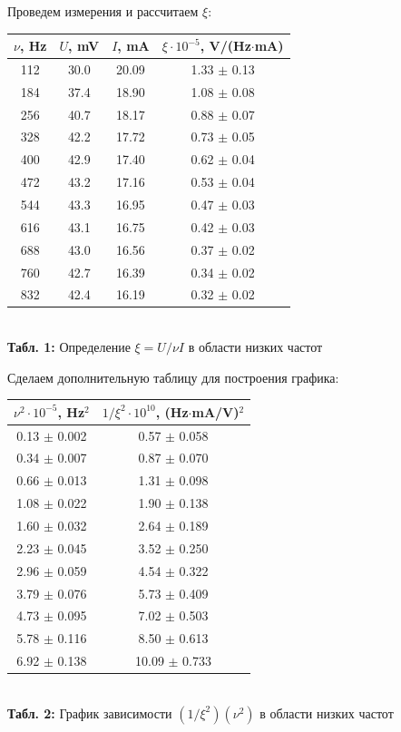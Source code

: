 \documentclass[12pt,a4paper]{scrartcl}
\begin{document}
	Проведем измерения и рассчитаем $\xi$:
	
	\begin{center}
		\begin{tabular}{|c|c|c|c|}
			\hline
			$\nu$, Hz & $U$, mV & $I$, mA & $\xi \cdot 10^{-5}$, V/(Hz$\cdot$mA)
			\\\hline
			112 & 30.0 & 20.09 & 1.33 $\pm$ 0.13
			\\\hline
			184 & 37.4 & 18.90 & 1.08 $\pm$ 0.08
			\\\hline
			256 & 40.7 & 18.17 & 0.88 $\pm$ 0.07
			\\\hline
			328 & 42.2 & 17.72 & 0.73 $\pm$ 0.05
			\\\hline
			400 & 42.9 & 17.40 & 0.62 $\pm$ 0.04
			\\\hline
			472 & 43.2 & 17.16 & 0.53 $\pm$ 0.04
			\\\hline
			544 & 43.3 & 16.95 & 0.47 $\pm$ 0.03
			\\\hline
			616 & 43.1 & 16.75 & 0.42 $\pm$ 0.03
			\\\hline
			688 & 43.0 & 16.56 & 0.37 $\pm$ 0.02
			\\\hline
			760 & 42.7 & 16.39 & 0.34 $\pm$ 0.02
			\\\hline
			832 & 42.4 & 16.19 & 0.32 $\pm$ 0.02
			\\\hline
		\end{tabular}
		\\\textbf{Табл. 1:} Определение $\xi = U/\nu I$ в области низких частот
	\end{center}

	Сделаем дополнительную таблицу для построения графика:

	\begin{center}
		\begin{tabular}{|c|c|}
			\hline
			$\nu^2 \cdot 10^{-5}$, Hz$^2$ & $1/\xi^2 \cdot 10^{10}$, (Hz$\cdot$mA/V)$^2$
			\\\hline
			0.13 $\pm$ 0.002 & 0.57 $\pm$ 0.058
			\\\hline
			0.34 $\pm$ 0.007 & 0.87 $\pm$ 0.070
			\\\hline
			0.66 $\pm$ 0.013 & 1.31 $\pm$ 0.098
			\\\hline
			1.08 $\pm$ 0.022 & 1.90 $\pm$ 0.138
			\\\hline
			1.60 $\pm$ 0.032 & 2.64 $\pm$ 0.189
			\\\hline
			2.23 $\pm$ 0.045 & 3.52 $\pm$ 0.250
			\\\hline
			2.96 $\pm$ 0.059 & 4.54 $\pm$ 0.322
			\\\hline
			3.79 $\pm$ 0.076 & 5.73 $\pm$ 0.409
			\\\hline
			4.73 $\pm$ 0.095 & 7.02 $\pm$ 0.503
			\\\hline
			5.78 $\pm$ 0.116 & 8.50 $\pm$ 0.613
			\\\hline
			6.92 $\pm$ 0.138 & 10.09 $\pm$ 0.733
			\\\hline
		\end{tabular}
		\\\textbf{Табл. 2:} График зависимости $(1/\xi^2)(\nu^2)$ в области низких частот
	\end{center}
	
\end{document}
